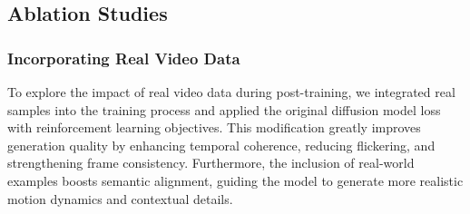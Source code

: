 \subsection{Ablation Studies}
%




\subsubsection{Incorporating Real Video Data}

To explore the impact of real video data during post-training, we integrated real samples into the training process and applied the original diffusion model loss with reinforcement learning objectives. This modification greatly improves generation quality by enhancing temporal coherence, reducing flickering, and strengthening frame consistency. Furthermore, the inclusion of real-world examples boosts semantic alignment, guiding the model to generate more realistic motion dynamics and contextual details.

